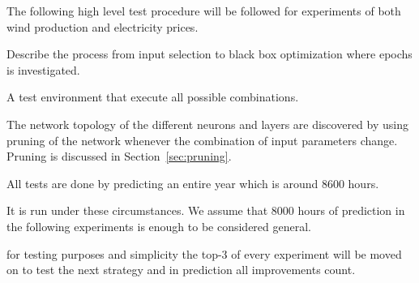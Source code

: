 The following high level test procedure will be followed for experiments of both wind production and electricity prices. 

Describe the process from input selection to black box optimization where epochs is investigated.

A test environment that execute all possible combinations. 

The network topology of the different neurons and layers are discovered by using pruning of the network whenever the combination of input parameters change. Pruning is discussed in Section~\ref{sec:pruning}.

All tests are done by predicting an entire year which is around 8600 hours.


It is run under these circumstances. We assume that 8000 hours of prediction in the following experiments is enough to be considered general. 

for testing purposes and simplicity the top-3 of every experiment will be moved on to test the next strategy and in prediction all improvements count.
